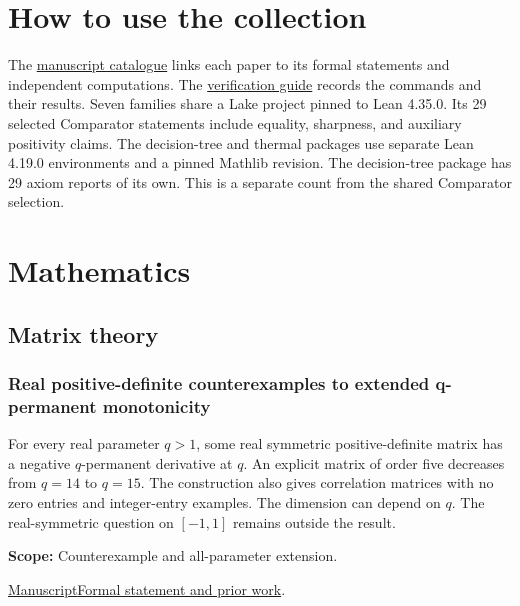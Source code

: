 \documentclass[11pt,a4paper]{article}
\begin{document}
\setcounter{tocdepth}{2}
\tableofcontents

\section{How to use the collection}

The \href{https://github.com/dvgyl/math-and-theory/blob/main/CONTENTS.md}{manuscript catalogue} links each paper to its formal statements and independent computations. The \href{https://github.com/dvgyl/math-and-theory/blob/main/verification/README.md}{verification guide} records the commands and their results. Seven families share a Lake project pinned to Lean 4.35.0. Its 29 selected Comparator statements include equality, sharpness, and auxiliary positivity claims. The decision-tree and thermal packages use separate Lean 4.19.0 environments and a pinned Mathlib revision. The decision-tree package has 29 axiom reports of its own. This is a separate count from the shared Comparator selection.

\section{Mathematics}

\subsection{Matrix theory}

\subsubsection{Real positive-definite counterexamples to extended q-permanent monotonicity}

For every real parameter $q>1$, some real symmetric positive-definite matrix has a negative $q$-permanent derivative at $q$. An explicit matrix of order five decreases from $q=14$ to $q=15$. The construction also gives correlation matrices with no zero entries and integer-entry examples. The dimension can depend on $q$. The real-symmetric question on $[-1,1]$ remains outside the result.

\par\smallskip

\noindent\textbf{Scope:} Counterexample and all-parameter extension.

\par\smallskip

\noindent\href{https://github.com/dvgyl/math-and-theory/blob/main/papers/mathematics/q-permanent/paper.pdf}{Manuscript}\quad\href{https://github.com/dvgyl/math-and-theory/blob/main/lean/docs/mathematics/q-permanent.md}{Formal statement and prior work}.
\end{document}
